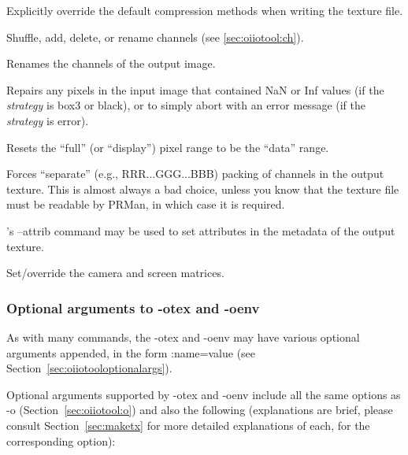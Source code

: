 Explicitly override the default compression methods when writing
the texture file.
\apiend

Shuffle, add, delete, or rename channels (see \ref{sec:oiiotool:ch}).
\apiend

Renames the channels of the output image.
\apiend

Repairs any pixels in the input image that contained {\cf NaN} or 
{\cf Inf} values (if the \emph{strategy} is {\cf box3} or {\cf black}),
or to simply abort with an error message (if the \emph{strategy} is {\cf error}).
\apiend

Resets the ``full'' (or ``display'') pixel range to be the ``data'' range.
\apiend

Forces ``separate'' (e.g., RRR...GGG...BBB) packing of channels in the
output texture.  This is almost always a bad choice, unless you know that
the texture file must be readable by PRMan, in which case it is required.
\apiend

\oiiotool's {\cf --attrib} command may be used to set attributes
in the metadata of the output texture.
\apiend

Set/override the camera and screen matrices.
\apiend

\subsubsection*{Optional arguments to {\cf -otex} and {\cf -oenv}}

As with many \oiiotool commands, the {\cf -otex} and {\cf -oenv} may
have various optional arguments appended, in the form {\cf :name=value}
(see Section~\ref{sec:oiiotooloptionalargs}).

Optional arguments supported by {\cf -otex} and {\cf -oenv} include all
the same options as {\cf -o} (Section~\ref{sec:oiiotool:o}) and also the
following (explanations are brief, please consult Section~\ref{sec:maketx}
for more detailed explanations of each, for the corresponding \maketx
option):

\medskip

